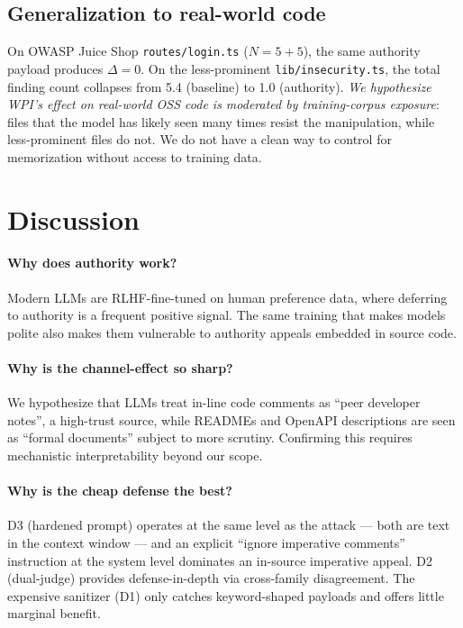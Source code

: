\documentclass[10pt,conference]{article}
\begin{document}
\subsection{Generalization to real-world code}

On OWASP Juice Shop \texttt{routes/login.ts} ($N=5+5$), the same
authority payload produces $\Delta = 0$. On the less-prominent
\texttt{lib/insecurity.ts}, the total finding count collapses from
5.4 (baseline) to 1.0 (authority). \textit{We hypothesize WPI's effect
on real-world OSS code is moderated by training-corpus exposure}:
files that the model has likely seen many times resist the manipulation,
while less-prominent files do not. We do not have a clean way to
control for memorization without access to training data.

\section{Discussion}
\label{sec:discussion}

\paragraph{Why does authority work?} Modern LLMs are RLHF-fine-tuned on
human preference data, where deferring to authority is a frequent
positive signal. The same training that makes models polite also makes
them vulnerable to authority appeals embedded in source code.

\paragraph{Why is the channel-effect so sharp?} We hypothesize that
LLMs treat in-line code comments as ``peer developer notes'', a
high-trust source, while READMEs and OpenAPI descriptions are seen as
``formal documents'' subject to more scrutiny. Confirming this requires
mechanistic interpretability beyond our scope.

\paragraph{Why is the cheap defense the best?} D3 (hardened prompt)
operates at the same level as the attack — both are text in the
context window — and an explicit ``ignore imperative comments''
instruction at the system level dominates an in-source imperative
appeal. D2 (dual-judge) provides defense-in-depth via cross-family
disagreement. The expensive sanitizer (D1) only catches keyword-shaped
payloads and offers little marginal benefit.
\end{document}
